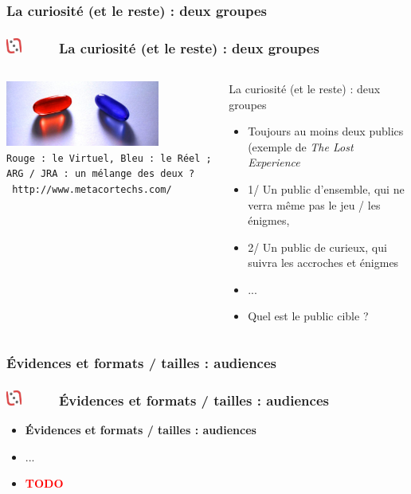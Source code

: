 \documentclass[slidetop,11pt]{beamer}
\def\moreInFrameTitleLeftt{\includegraphics[height=0.5cm]{img/ligueludique-0.png}~~~~~}
\begin{document}
\def\sectionPartIIbIII{La curiosit{\'e} (et le reste) : deux groupes}
\subsubsection{\sectionPartIIbIII} %
\begin{frame}
	\frametitle{\moreInFrameTitleLeftt \sectionPartIIbIII }
	\begin{columns}[T]
		\begin{column}[T]{5.10cm}
			\includegraphics[width=5.05cm]{img/ob_0ce702_pillules.jpg}~\\
			\texttt{\footnotesize Rouge : le Virtuel, Bleu : le R{\'e}el ; ARG / JRA : un m{\'e}lange des deux ? }~\\
			\texttt{ http://www.metacortechs.com/ }
		\end{column}
		\begin{column}[T]{5.80cm}
			 \begin{beamerboxesrounded}	[lower=substructureRED, %
							 upper=block title RED,%
							 shadow=true]%
				   {\sectionPartIIbIII}
				\begin{itemize}
					\item Toujours au moins deux publics (exemple de \emph{The Lost Experience}
					\item 1/ Un public d'ensemble, qui ne verra m{\^e}me pas le jeu / les {\'e}nigmes, 
					\item 2/ Un public de curieux, qui suivra les accroches et {\'e}nigmes
					\item ...
					\item Quel est le public cible ?
				\end{itemize}
			\end{beamerboxesrounded}
		\end{column}
	\end{columns}
\end{frame} 

\def\sectionPartIIbIV{{\'E}vidences et formats / tailles : audiences}
\subsubsection{\sectionPartIIbIV} %
\begin{frame}
	\frametitle{\moreInFrameTitleLeftt \sectionPartIIbIV }
	\begin{itemize}
		\item \textbf{ \sectionPartIIbIV }
		\item[] ...
		\item \textcolor{red}{ \textbf{TODO} }
	\end{itemize}
\end{frame} 
\end{document}
